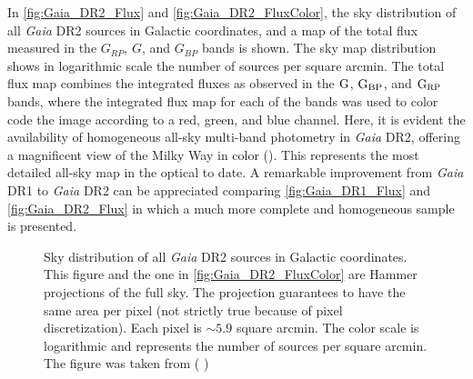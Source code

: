 In \autoref{fig:Gaia_DR2_Flux} and \autoref{fig:Gaia_DR2_FluxColor}, the sky distribution of all \textit{Gaia} DR2 sources in Galactic coordinates, and a map of the total flux measured in the $G_{RP}$, $G$, and $G_{BP}$ bands is shown. The sky map distribution shows in logarithmic scale the number of sources per square arcmin. The total flux map combines the integrated fluxes as observed in the $\textnormal{G}$,  $\textnormal{G}_\textnormal{BP}$, and  $\textnormal{G}_\textnormal{RP}$ bands, where the integrated flux map for each of the bands was used to color code the image according to a red, green, and blue channel. Here, it is evident the availability of homogeneous all-sky multi-band photometry in \textit{Gaia} DR2, offering a magnificent view of the Milky Way in color  (\citeyear{2018arXiv180409365G}). This represents the most detailed all-sky map in the optical to date. A remarkable improvement from \textit{Gaia} DR1 to \textit{Gaia} DR2 can be appreciated comparing \autoref{fig:Gaia_DR1_Flux} and \autoref{fig:Gaia_DR2_Flux} in which a much more complete and homogeneous sample is presented.\\  

\begin{figure}[!ht]
\centering
\caption{\scriptsize{ Sky distribution of all \textit{Gaia} DR2 sources in Galactic coordinates. This figure and the one in \autoref{fig:Gaia_DR2_FluxColor} are Hammer projections of the full sky.
The projection guarantees to have the same area per pixel (not strictly true because of pixel discretization). Each pixel is $\sim5.9$ square
arcmin. The color scale is logarithmic and represents the number of sources per square arcmin. The figure was taken from ( \citeyear{2018arXiv180409365G})}}
\label{fig:Gaia_DR2_Flux}
\end{figure}

